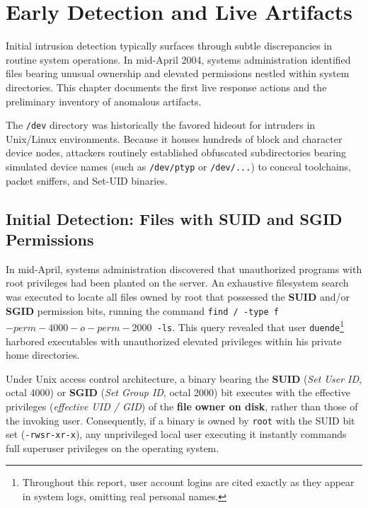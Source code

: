 \chapter{Early Detection and Live Artifacts}

Initial intrusion detection typically surfaces through subtle discrepancies in routine system operations. In mid-April 2004, systems administration identified files bearing unusual ownership and elevated permissions nestled within system directories. This chapter documents the first live response actions and the preliminary inventory of anomalous artifacts.

\begin{notaforense}
The \texttt{/dev} directory was historically the favored hideout for intruders in Unix/Linux environments. Because it houses hundreds of block and character device nodes, attackers routinely established obfuscated subdirectories bearing simulated device names (such as \texttt{/dev/ptyp} or \texttt{/dev/...}) to conceal toolchains, packet sniffers, and Set-UID binaries.
\end{notaforense}

\section{Initial Detection: Files with SUID and SGID Permissions}

In mid-April, systems administration discovered that unauthorized programs with root privileges had been planted on the server. An exhaustive filesystem search was executed to locate all files owned by root that possessed the \textbf{SUID} and/or \textbf{SGID} permission bits, running the command \texttt{find / -type f \( -perm -4000 -o -perm -2000 \) -ls}. This query revealed that user \texttt{duende}\footnote{Throughout this report, user account logins are cited exactly as they appear in system logs, omitting real personal names.} harbored executables with unauthorized elevated privileges within his private home directories.

Under Unix access control architecture, a binary bearing the \textbf{SUID} (\textit{Set User ID}, octal 4000) or \textbf{SGID} (\textit{Set Group ID}, octal 2000) bit executes with the effective privileges (\textit{effective UID / GID}) of the \textbf{file owner on disk}, rather than those of the invoking user. Consequently, if a binary is owned by \texttt{root} with the SUID bit set (\texttt{-rwsr-xr-x}), any unprivileged local user executing it instantly commands full superuser privileges on the operating system.

